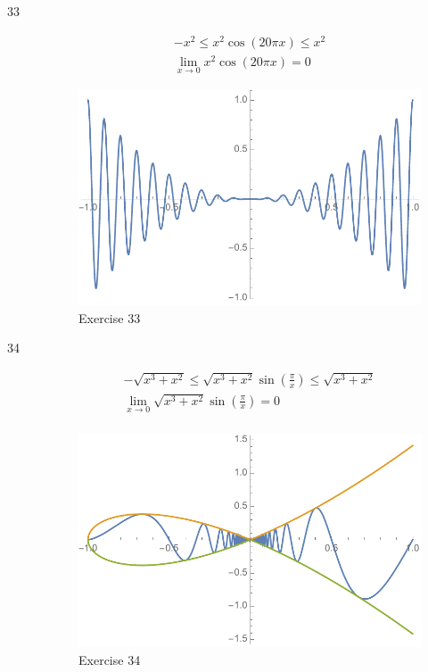 \documentclass[letterpaper, landscape]{exam}
\begin{document}
\begin{description}
      \item[33]
        \begin{align*}
          -x^2 \leq x^2 \cos (20 \pi  x) \leq x^2 \\
          \lim_{x \to 0} x^2 \cos (20 \pi  x) = \boxed{ 0 }
        \end{align*}

        \begin{figure}[H]
          \centering
          \includegraphics[scale = 0.5]{ex33.pdf}
          \caption{Exercise 33}
          \label{fig:ex33}
        \end{figure}

      \item[34]
        \begin{align*}
          -\sqrt{x^3 + x^2} \leq \sqrt{x^3 + x^2} \sin \left( \frac{\pi}{x} \right) \leq \sqrt{x^3 + x^2} \\
          \lim_{x \to 0} \sqrt{x^3 + x^2} \sin \left( \frac{\pi}{x} \right) = \boxed{ 0 } \\
        \end{align*}

        \begin{figure}[H]
          \centering
          \includegraphics[scale = 0.5]{ex34.pdf}
          \caption{Exercise 34}
          \label{fig:ex34}
        \end{figure}



\end{description}
\end{document}
